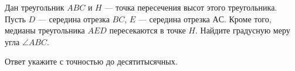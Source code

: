 
Дан треугольник $ABC$ и $H$ — точка пересечения высот этого треугольника. 
Пусть $D$ — середина отрезка $BC$, $E$ — середина отрезка $АС$. 
Кроме того, медианы треугольника $AED$ пересекаются в точке $H$. Найдите градусную меру угла $\angle ABC$. 

Ответ укажите с точностью до десятитысячных.

\soultionSection

